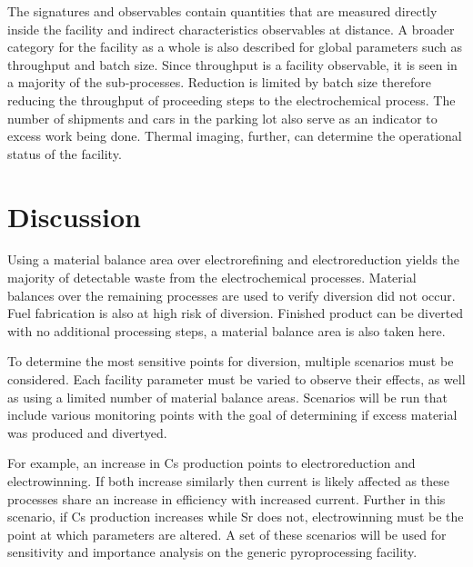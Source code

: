 \documentclass{anstrans}
\begin{document}
The signatures and observables contain quantities that are measured directly inside
the facility and indirect characteristics observables at distance. A broader category for the facility as a whole is also described for global parameters such as
throughput and batch size. Since throughput is a facility observable, 
it is seen in a majority of the sub-processes. Reduction is limited by 
batch size therefore reducing the throughput of proceeding steps to the 
electrochemical process. The number of shipments and cars in the parking lot also serve as an indicator to excess work being done. Thermal imaging, further, can
determine the operational status of the facility. 


\section{Discussion}
Using a material balance area over electrorefining and electroreduction yields the majority of detectable waste from 
the electrochemical processes.  Material balances over the remaining 
processes are used to verify diversion did not occur. Fuel fabrication is also at high risk of diversion. Finished product can be diverted with no additional 
processing steps, a material balance area is also taken here. 

To determine the most sensitive points for diversion, multiple scenarios must be considered. 
Each facility parameter must be varied to observe their effects, as well as using a limited number of material balance areas. 
Scenarios will be run that include various monitoring points with the goal of determining if excess material was produced 
and divertyed. 

For example, an increase in Cs production points to electroreduction and electrowinning. 
If both increase similarly then current is likely affected as these processes share an increase in efficiency with increased 
current. Further in this scenario, if Cs production increases while Sr does not, electrowinning must be the point at which 
parameters are altered. A set of these scenarios will be used for sensitivity and importance analysis on the generic 
pyroprocessing facility.

\end{document}
